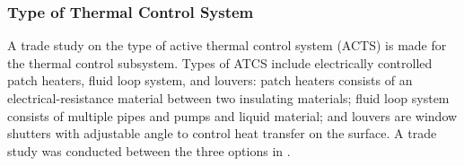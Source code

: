 \subsubsection{Type of Thermal Control System}
\label{sect:thermal_to}
A trade study on the type of active thermal control system (ACTS) is made for the thermal control subsystem. Types of ATCS include electrically controlled patch heaters, fluid loop system, and louvers: patch heaters consists of an electrical-resistance material between two insulating materials; fluid loop system consists of multiple pipes and pumps and liquid material; and louvers are window shutters with adjustable angle to control heat transfer on the surface.  A trade study was conducted between the three options in .

